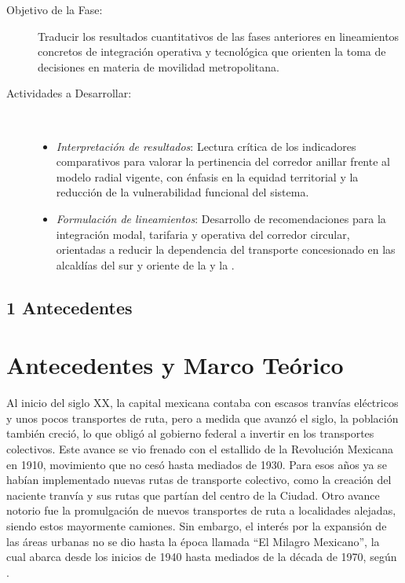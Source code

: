 \begin{description}
    \item[Objetivo de la Fase:] Traducir los resultados cuantitativos de las fases
    anteriores en lineamientos concretos de integración operativa y tecnológica que
    orienten la toma de decisiones en materia de movilidad metropolitana.

    \item[Actividades a Desarrollar:]~
    \begin{itemize}
        \item \textit{Interpretación de resultados}: Lectura crítica de los
        indicadores comparativos para valorar la pertinencia del corredor anillar
        frente al modelo radial vigente, con énfasis en la equidad territorial y la
        reducción de la vulnerabilidad funcional del sistema.
        \item \textit{Formulación de lineamientos}: Desarrollo de recomendaciones
        para la integración modal, tarifaria y operativa del corredor circular,
        orientadas a reducir la dependencia del transporte concesionado en las
        alcaldías del sur y oriente de la \cdmx{} y la \zmvm{}
        \parencite{semovi2020diagnostico}.
    \end{itemize}
\end{description}

\subsection*{1 Antecedentes}

\section*{Antecedentes y Marco Teórico}
\label{ch:marco-teorico}

Al inicio del siglo XX, la capital mexicana contaba con escasos tranvías eléctricos
y unos pocos transportes de ruta, pero a medida que avanzó el siglo, la población
también creció, lo que obligó al gobierno federal a invertir en los transportes
colectivos. Este avance se vio frenado con el estallido de la Revolución Mexicana
en 1910, movimiento que no cesó hasta mediados de 1930. Para esos años ya se
habían implementado nuevas rutas de transporte colectivo, como la creación del
naciente tranvía y sus rutas que partían del centro de la Ciudad. Otro avance
notorio fue la promulgación de nuevos transportes de ruta a localidades alejadas,
siendo estos mayormente camiones. Sin embargo, el interés por la expansión de las
áreas urbanas no se dio hasta la época llamada ``El Milagro Mexicano'', la cual
abarca desde los inicios de 1940 hasta mediados de la década de 1970, según
\textcite{molina2018}.

